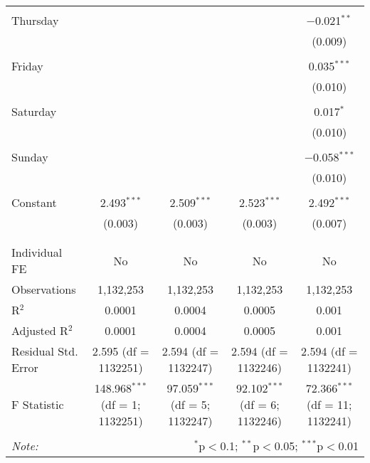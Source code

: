 \documentclass[
]{article}
\begin{document}
\begin{table}[!htbp]
{\begin{tabular}{@{\extracolsep{5pt}}lcccc}
  & & & & \\ 
 Thursday &  &  &  & $-$0.021$^{**}$ \\ 
  &  &  &  & (0.009) \\ 
  & & & & \\ 
 Friday &  &  &  & 0.035$^{***}$ \\ 
  &  &  &  & (0.010) \\ 
  & & & & \\ 
 Saturday &  &  &  & 0.017$^{*}$ \\ 
  &  &  &  & (0.010) \\ 
  & & & & \\ 
 Sunday &  &  &  & $-$0.058$^{***}$ \\ 
  &  &  &  & (0.010) \\ 
  & & & & \\ 
 Constant & 2.493$^{***}$ & 2.509$^{***}$ & 2.523$^{***}$ & 2.492$^{***}$ \\ 
  & (0.003) & (0.003) & (0.003) & (0.007) \\ 
  & & & & \\ 
\hline \\[-1.8ex] 
Individual FE & No & No & No & No \\ 
Observations & 1,132,253 & 1,132,253 & 1,132,253 & 1,132,253 \\ 
R$^{2}$ & 0.0001 & 0.0004 & 0.0005 & 0.001 \\ 
Adjusted R$^{2}$ & 0.0001 & 0.0004 & 0.0005 & 0.001 \\ 
Residual Std. Error & 2.595 (df = 1132251) & 2.594 (df = 1132247) & 2.594 (df = 1132246) & 2.594 (df = 1132241) \\ 
F Statistic & 148.968$^{***}$ (df = 1; 1132251) & 97.059$^{***}$ (df = 5; 1132247) & 92.102$^{***}$ (df = 6; 1132246) & 72.366$^{***}$ (df = 11; 1132241) \\ 
\hline 
\hline \\[-1.8ex] 
\textit{Note:}  & \multicolumn{4}{r}{$^{*}$p$<$0.1; $^{**}$p$<$0.05; $^{***}$p$<$0.01} \\ 
\end{tabular}
} 
\end{table} 
\newpage
\end{document}
